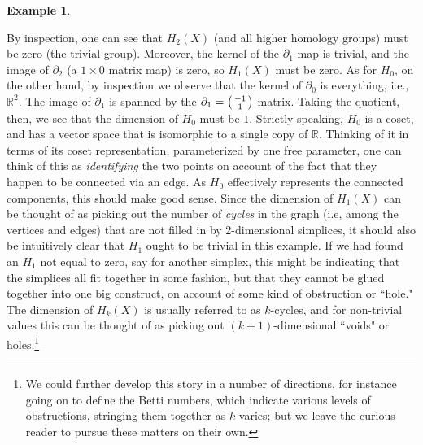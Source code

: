 \documentclass[a4paper]{book}
\theoremstyle{definition}
\newtheorem{example}{Example}[section]
\theoremstyle{definition}
\theoremstyle{definition}
\theoremstyle{theorem}
\theoremstyle{definition}
\begin{document}
\begin{example}
	\begin{center} 
	 \end{center} \par \noindent 
	By inspection, one can see that $H_2(X)$ (and all higher homology groups) must be zero (the trivial group). Moreover, the kernel of the $\partial_1$ map is trivial, and the image of $\partial_2$ (a $1\times 0$ matrix map) is zero, so $H_1(X)$ must be zero. As for $H_0$, on the other hand, by inspection we observe that the kernel of $\partial_0$ is everything, i.e., $\mathbb{R}^2$. The image of $\partial_1$ is spanned by the $\partial_1 = \begin{psmallmatrix} -1 \\ 1
	\end{psmallmatrix}$ matrix. Taking the quotient, then, we see that the dimension of $H_0$ must be $1$. Strictly speaking, $H_0$ is a coset, and has a vector space that is isomorphic to a single copy of $\mathbb{R}$. Thinking of it in terms of its coset representation, parameterized by one free parameter, one can think of this as \textit{identifying} the two points on account of the fact that they happen to be connected via an edge. As $H_0$ effectively represents the connected components, this should make good sense. Since the dimension of $H_1 (X)$ can be thought of as picking out the number of \textit{cycles} in the graph (i.e, among the vertices and edges) that are not filled in by 2-dimensional simplices, it should also be intuitively clear that $H_1$ ought to be trivial in this example. If we had found an $H_1$ not equal to zero, say for another simplex, this might be indicating that the simplices all fit together in some fashion, but that they cannot be glued together into one big construct, on account of some kind of obstruction or ``hole." The dimension of $H_k(X)$ is usually referred to as $k$-cycles, and for non-trivial values this can be thought of as picking out $(k+1)$-dimensional ``voids" or holes.\footnote{We could further develop this story in a number of directions, for instance going on to define the Betti numbers, which indicate various levels of obstructions, stringing them together as $k$ varies; but we leave the curious reader to pursue these matters on their own.} \par 

\end{example}
\end{document}
